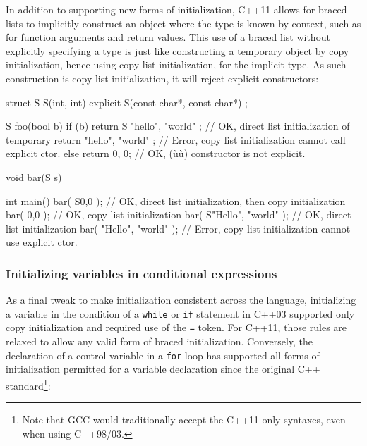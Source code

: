 In addition to supporting new forms of initialization, C++11 allows for
braced lists to implicitly construct an object where the type is known
by context, such as for function arguments and return values. This use
of a braced list without explicitly specifying a type is just like
constructing a temporary object by copy initialization, hence using copy
list initialization, for the implicit type. As such construction is copy
list initialization, it will reject explicit constructors:

\begin{emcppslisting}
struct S
{
    S(int, int) {}
    explicit S(const char*, const char*) {}
};

S foo(bool b)
{
    if (b)
    {
        return S{ "hello", "world" };  // OK, direct list initialization of temporary
        return { "hello", "world" };   // Error, copy list initialization cannot call explicit ctor.
    }
    else
    {
        return {0, 0};  // OK, (ù{}ù) constructor is not explicit.
    }
}

void bar(S s) { }

int main()
{
   bar( S{0,0} );  // OK, direct list initialization, then copy initialization
   bar(  {0,0} );  // OK, copy list initialization
   bar( S{"Hello", "world"} );  // OK, direct list initialization
   bar(  {"Hello", "world"} );  // Error, copy list initialization cannot use explicit ctor.
}
\end{emcppslisting}


\subsubsection[Initializing variables in conditional expressions]{Initializing variables in conditional expressions}\label{initializing-variables-in-conditional-expressions}

As a final tweak to make initialization consistent across the language,
initializing a variable in the condition of a \lstinline!while! or
\lstinline!if! statement in C++03 supported only copy initialization and
required use of the \lstinline!=! token. For C++11, those rules are relaxed
to allow any valid form of braced initialization. Conversely, the
declaration of a control variable in a \lstinline!for! loop has supported
all forms of initialization permitted for a variable declaration since
the original C++ standard{\cprotect\footnote{Note that GCC would
traditionally accept the C++11-only syntaxes, even when using
  C++98/03.}}:

